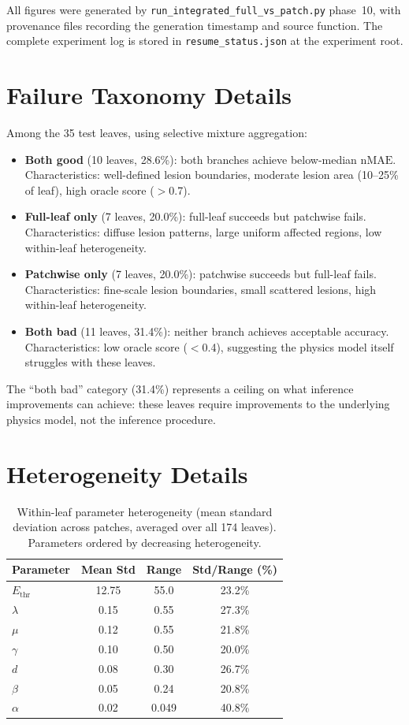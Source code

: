 \documentclass[11pt,a4paper]{article}
\newcommand{\nMAE}{\mathrm{nMAE}}
\begin{document}
All figures were generated by \texttt{run\_integrated\_full\_vs\_patch.py} phase~10, with provenance files recording the generation timestamp and source function.
The complete experiment log is stored in \texttt{resume\_status.json} at the experiment root.


\section{Failure Taxonomy Details}
\label{app:failures}

Among the 35 test leaves, using selective mixture aggregation:
\begin{itemize}[nosep]
    \item \textbf{Both good} (10 leaves, 28.6\%): both branches achieve below-median $\nMAE$. Characteristics: well-defined lesion boundaries, moderate lesion area (10--25\% of leaf), high oracle score ($>$0.7).
    \item \textbf{Full-leaf only} (7 leaves, 20.0\%): full-leaf succeeds but patchwise fails. Characteristics: diffuse lesion patterns, large uniform affected regions, low within-leaf heterogeneity.
    \item \textbf{Patchwise only} (7 leaves, 20.0\%): patchwise succeeds but full-leaf fails. Characteristics: fine-scale lesion boundaries, small scattered lesions, high within-leaf heterogeneity.
    \item \textbf{Both bad} (11 leaves, 31.4\%): neither branch achieves acceptable accuracy. Characteristics: low oracle score ($<$0.4), suggesting the physics model itself struggles with these leaves.
\end{itemize}

The ``both bad'' category (31.4\%) represents a ceiling on what inference improvements can achieve: these leaves require improvements to the underlying physics model, not the inference procedure.


\section{Heterogeneity Details}
\label{app:heterogeneity}

\begin{table}[h]
\centering
\caption{Within-leaf parameter heterogeneity (mean standard deviation across patches, averaged over all 174 leaves). Parameters ordered by decreasing heterogeneity.}
\label{tab:heterogeneity}
\begin{tabular}{lccc}
\toprule
Parameter & Mean Std & Range & Std/Range (\%) \\
\midrule
$E_\mathrm{thr}$ & 12.75 & 55.0 & 23.2\% \\
$\lambda$ & 0.15 & 0.55 & 27.3\% \\
$\mu$ & 0.12 & 0.55 & 21.8\% \\
$\gamma$ & 0.10 & 0.50 & 20.0\% \\
$d$ & 0.08 & 0.30 & 26.7\% \\
$\beta$ & 0.05 & 0.24 & 20.8\% \\
$\alpha$ & 0.02 & 0.049 & 40.8\% \\
\bottomrule
\end{tabular}
\end{table}
\end{document}
